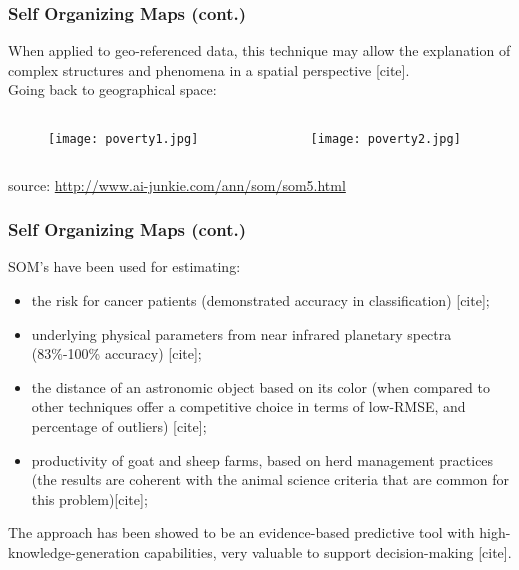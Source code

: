 \documentclass[hyperref={pdfpagelabels=true}]{beamer}
\begin{document}
\begin{frame}
\frametitle{Self Organizing Maps (cont.)}
When applied to geo-referenced data, this technique may allow the
explanation of complex structures and phenomena in a spatial perspective [cite].\\
\vspace{5mm}
Going back to geographical space:
\begin{columns}
  \begin{column}{5cm}
    \begin{figure}
    \texttt{[image: poverty1.jpg]}
    \end{figure}
  \end{column}
  \begin{column}{5cm}
    \begin{figure}
    \texttt{[image: poverty2.jpg]}
    \end{figure}
  \end{column}
\end{columns}
\tiny{source: \url{http://www.ai-junkie.com/ann/som/som5.html}}\\
\end{frame}

\begin{frame}
\frametitle{Self Organizing Maps (cont.)}
SOM's have been used for estimating:
\begin{itemize}
\item the risk for cancer patients (demonstrated accuracy in classification) [cite];
\item underlying physical parameters from near infrared planetary spectra (83\%-100\% accuracy) [cite];
\item the distance of an astronomic object based on its color (when compared to other techniques offer a competitive choice in terms of low-RMSE, and percentage of outliers) [cite];
\item productivity of goat and sheep farms, based on herd management practices (the results
are coherent with the animal science criteria that are common for this problem)[cite];
\end{itemize}
The approach has been showed to be an evidence-based predictive tool with high-knowledge-generation capabilities, very valuable to support decision-making [cite].
\end{frame}
\end{document}
